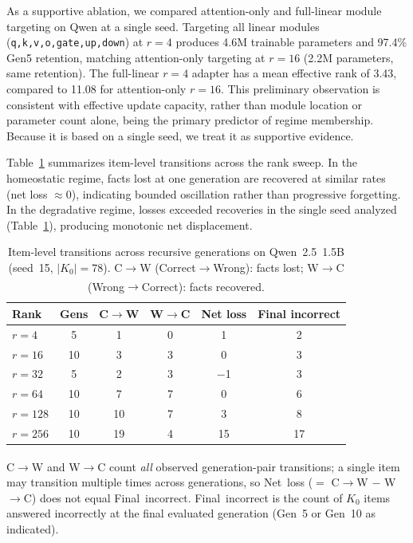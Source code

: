 \documentclass[a4paper,fleqn]{cas-dc}
\newif\ifshowchanges
\newcommand{\rev}[1]{\ifshowchanges{\color{blue}#1}\else{#1}\fi}
\renewcommand{\arraystretch}{1.8}
\begin{document}
As a supportive ablation, we compared attention-only and full-linear module
targeting on Qwen at a single seed. Targeting all linear modules
(\texttt{q,k,v,o,gate,up,down}) at $r=4$ produces 4.6M trainable parameters and
97.4\% Gen5 retention, matching attention-only targeting at $r=16$ (2.2M
parameters, same retention). The full-linear $r=4$ adapter has a mean effective
rank of 3.43, compared to 11.08 for attention-only $r=16$. This preliminary
observation is consistent with effective update capacity, rather than module
location or parameter count alone, being the primary predictor of regime
membership. Because it is based on a single seed, we treat it as supportive
evidence.

Table~\ref{tab:transitions} summarizes item-level transitions across the rank
sweep. In the homeostatic regime, facts lost at one generation are recovered at
similar rates (net loss $\approx 0$), indicating bounded oscillation rather than
progressive forgetting. In the degradative regime, \rev{losses exceeded recoveries in the single seed analyzed (Table~\ref{tab:transitions}), producing monotonic net displacement.}

\begin{table}[!htbp]
\caption{Item-level transitions across recursive generations on
Qwen~2.5~1.5B (seed~15, $\rev{\lvert K_0\rvert = 78}$). C$\to$W (Correct$\to$Wrong): facts lost;
W$\to$C (Wrong$\to$Correct): facts recovered.\textsuperscript{\dag}}\label{tab:transitions}
\footnotesize
\renewcommand{\arraystretch}{1.4}
\begin{tabular}{@{}lccccc@{}}
\toprule
Rank & Gens & C$\to$W & W$\to$C & Net loss & Final incorrect \\
\midrule
$r=4$   & 5  & 1  & 0 & 1  & 2  \\
$r=16$  & 10 & 3  & 3 & 0  & 3  \\
$r=32$  & 5  & 2  & 3 & $-$1 & 3  \\
$r=64$  & 10 & 7  & 7 & 0  & 6  \\
$r=128$ & 10 & 10 & 7 & 3  & 8  \\
$r=256$ & 10 & 19 & 4 & 15 & 17 \\
\bottomrule
\end{tabular}
{\footnotesize\textsuperscript{\dag}C$\to$W and W$\to$C count \emph{all} observed generation-pair
transitions; a single item may transition multiple times across generations, so
Net~loss ($=$ C$\to$W $-$ W$\to$C) does not equal Final~incorrect.
Final~incorrect is the count of $K_0$ items answered incorrectly at the
final evaluated generation (Gen~5 or Gen~10 as indicated).}
\end{table}
\end{document}
